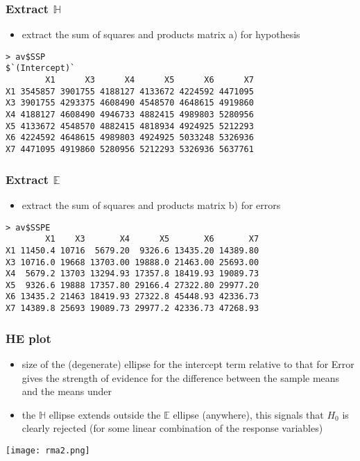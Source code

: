 \begin{frame}[fragile]\frametitle{Extract $\mathbb{H}$}
  \begin{itemize}
  \item extract the sum of squares and products matrix a) for hypothesis
  \end{itemize}\scriptsize
\begin{verbatim}
> av$SSP
$`(Intercept)`
        X1      X3      X4      X5      X6      X7
X1 3545857 3901755 4188127 4133672 4224592 4471095
X3 3901755 4293375 4608490 4548570 4648615 4919860
X4 4188127 4608490 4946733 4882415 4989803 5280956
X5 4133672 4548570 4882415 4818934 4924925 5212293
X6 4224592 4648615 4989803 4924925 5033248 5326936
X7 4471095 4919860 5280956 5212293 5326936 5637761  
\end{verbatim}
\end{frame}


\begin{frame}[fragile]\frametitle{Extract $\mathbb{E}$}
  \begin{itemize}
  \item extract the sum of squares and products matrix b) for errors
  \end{itemize}\scriptsize
\begin{verbatim}
> av$SSPE
        X1    X3       X4      X5       X6       X7
X1 11450.4 10716  5679.20  9326.6 13435.20 14389.80
X3 10716.0 19668 13703.00 19888.0 21463.00 25693.00
X4  5679.2 13703 13294.93 17357.8 18419.93 19089.73
X5  9326.6 19888 17357.80 29166.4 27322.80 29977.20
X6 13435.2 21463 18419.93 27322.8 45448.93 42336.73
X7 14389.8 25693 19089.73 29977.2 42336.73 47268.93
\end{verbatim}
\end{frame}


\begin{frame}[fragile]\frametitle{HE plot}
  \begin{itemize}
  \item  size of the (degenerate) ellipse for the intercept term relative to that for Error gives the strength of evidence for the difference between the sample means and the means under
  \item the $\mathbb{H}$ ellipse extends outside the $\mathbb{E}$ ellipse (anywhere), this signals that $H_0$ is clearly rejected (for some linear combination of the response variables)
  \end{itemize}
  \begin{center}
    \texttt{[image: rma2.png]}
  \end{center}
\end{frame}

